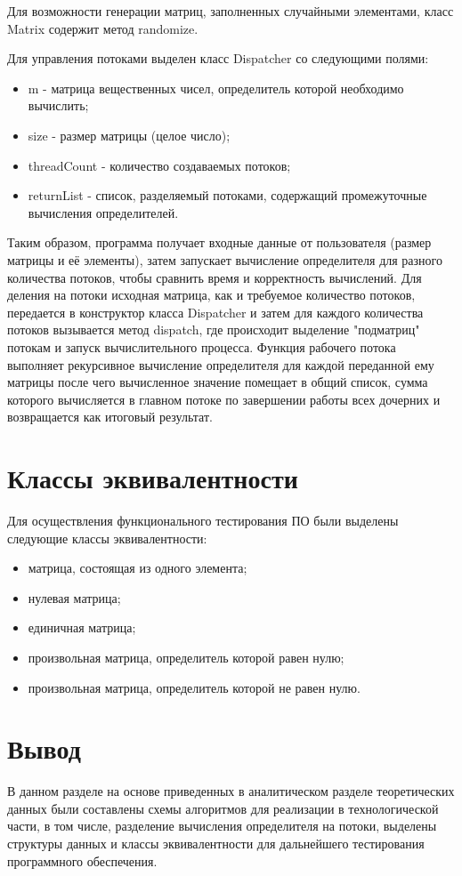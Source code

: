 \documentclass[a4paper,oneside,14pt]{extreport}
\begin{document}
Для возможности генерации матриц, заполненных случайными элементами, класс Matrix содержит метод randomize.

Для управления потоками выделен класс Dispatcher со следующими полями:
\begin{itemize}
	\item m - матрица вещественных чисел, определитель которой необходимо вычислить;
	\item size - размер матрицы (целое число);
	\item threadCount - количество создаваемых потоков;
	\item returnList - список, разделяемый потоками, содержащий промежуточные вычисления определителей.
\end{itemize}

Таким образом, программа получает входные данные от пользователя (размер матрицы и её элементы), затем запускает вычисление определителя для разного количества потоков, чтобы сравнить время и корректность вычислений. Для деления на потоки исходная матрица, как и требуемое количество потоков, передается в конструктор класса Dispatcher и затем для каждого количества потоков вызывается метод dispatch, где происходит выделение "подматриц" потокам и запуск вычислительного процесса. Функция рабочего потока выполняет рекурсивное вычисление определителя для каждой переданной ему матрицы после чего вычисленное значение помещает в общий список, сумма которого вычисляется в главном потоке по завершении работы всех дочерних и возвращается как итоговый результат.

\section{Классы эквивалентности}
Для осуществления функционального тестирования ПО были выделены следующие классы эквивалентности:
\begin{itemize}
	\item матрица, состоящая из одного элемента;
	\item нулевая матрица;
	\item единичная матрица;
	\item произвольная матрица, определитель которой равен нулю;
	\item произвольная матрица, определитель которой не равен нулю.
\end{itemize}

\section{Вывод}
В данном разделе на основе приведенных в аналитическом разделе теоретических данных были составлены схемы алгоритмов для реализации в технологической части, в том числе, разделение вычисления определителя на потоки, выделены структуры данных и классы эквивалентности для дальнейшего тестирования программного обеспечения. 
\end{document}
